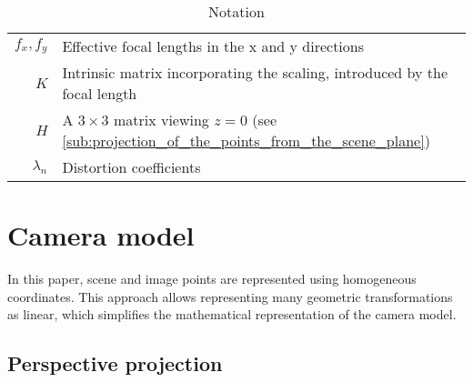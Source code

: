 \begin{table}[htbp]
\begin{tabular}{rl}
		\(f_x, f_y\)                   & Effective focal lengths in the x and y directions                                                      \\
		\(K\)                          & Intrinsic matrix incorporating the scaling, introduced by the focal length                             \\
		\(H\)                          & A \(3 \times 3\) matrix viewing \(z=0\) (see \cref{sub:projection_of_the_points_from_the_scene_plane}) \\
		\(\lambda_n\)                  & Distortion coefficients                                                                                \\
		\bottomrule
	\end{tabular}
	\caption{Notation}
\end{table}

\section{Camera model}\label{sec:camera_model}

In this paper, scene and image points are represented using homogeneous
coordinates. This approach allows representing many geometric transformations as
linear, which simplifies the mathematical representation of the camera model.

\subsection{Perspective projection}\label{sub:perspective_projection}


